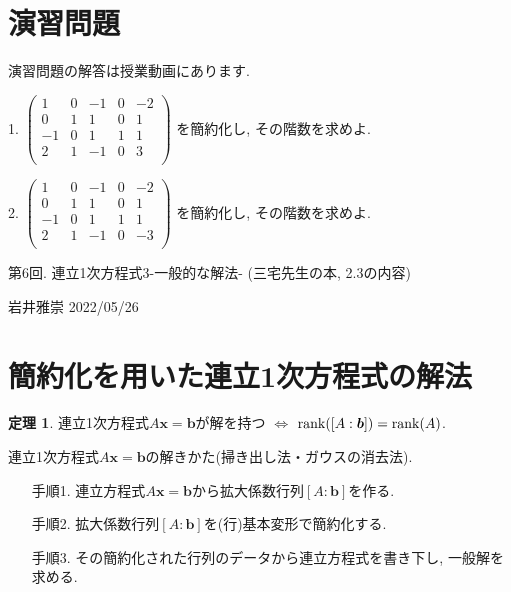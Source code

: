 \documentclass[dvipdfmx,a4paper,11pt]{article}
\theoremstyle{definition}
\newtheorem{thm}{定理}
\begin{document}
\section{演習問題}
演習問題の解答は授業動画にあります.

1.
$
 \begin{pmatrix}
 1& 0& -1  & 0&-2\\
 0& 1& 1  & 0&1\\
 -1& 0& 1 & 1&1\\
 2& 1& -1 & 0&3\\
 \end{pmatrix}
 $
 を簡約化し, その階数を求めよ.

2.
$
 \begin{pmatrix}
 1& 0& -1  & 0&-2\\
 0& 1& 1  & 0&1\\
  -1& 0& 1 & 1&1\\
 2& 1& -1 & 0&-3\\
 \end{pmatrix}
 $
 を簡約化し, その階数を求めよ.

\newpage

\begin{center}
{\Large 第6回. 連立1次方程式3-一般的な解法- (三宅先生の本, 2.3の内容)}
\end{center}

\begin{flushright}
 岩井雅崇 2022/05/26
\end{flushright}

\section{簡約化を用いた連立1次方程式の解法}
\begin{tcolorbox}[
    colback = white,
    colframe = green!35!black,
    fonttitle = \bfseries,
    breakable = true]
    \begin{thm}
連立1次方程式$A\bm{x} =\bm{b}$が解を持つ
$\Leftrightarrow$ ${\rm rank}([A:\bm{b}]) = {\rm rank}(A)$.
  \end{thm}
 \end{tcolorbox}

\begin{tcolorbox}[
    colback = white,
    colframe = green!35!black,
    fonttitle = \bfseries,
    breakable = true]
連立1次方程式$A\bm{x} =\bm{b}$の解きかた(掃き出し法・ガウスの消去法).
 \begin{enumerate}
 \item[手順1.] 連立方程式$A\bm{x} =\bm{b}$から拡大係数行列$[A:\bm{b}]$を作る.
 \item[手順2.] 拡大係数行列$[A:\bm{b}]$を(行)基本変形で簡約化する.
 \item[手順3.] その簡約化された行列のデータから連立方程式を書き下し, 一般解を求める.
 \end{enumerate}
 \end{tcolorbox}
 
\end{document}
